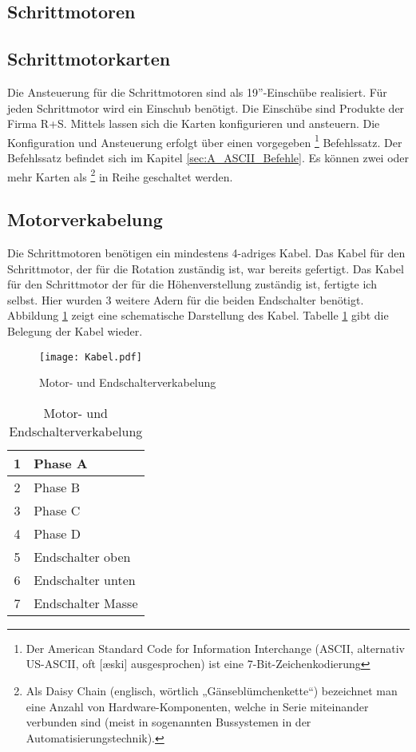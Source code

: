 \subsection{Schrittmotoren}

\subsection{Schrittmotorkarten}
Die Ansteuerung für die Schrittmotoren sind als 19''-Einschübe realisiert. Für jeden Schrittmotor wird ein Einschub benötigt.
Die Einschübe sind Produkte der Firma R+S. Mittels  lassen sich die Karten konfigurieren und ansteuern. Die Konfiguration und Ansteuerung erfolgt über einen vorgegeben 
\footnote{Der American Standard Code for Information Interchange (ASCII, alternativ US-ASCII, oft [æski] ausgesprochen) ist eine 7-Bit-Zeichenkodierung\cite{wiki:ASCII}}
 Befehlssatz. Der Befehlssatz befindet sich im Kapitel \ref{sec:A_ASCII_Befehle}. Es können zwei oder mehr Karten als 
\footnote{Als Daisy Chain (englisch, wörtlich „Gänseblümchenkette“) bezeichnet man eine Anzahl von Hardware-Komponenten, welche in Serie miteinander verbunden sind (meist in sogenannten Bussystemen in der Automatisierungstechnik).\cite{wiki:Daisy} } 
in Reihe geschaltet werden.
\subsection{Motorverkabelung}
Die Schrittmotoren benötigen ein mindestens 4-adriges Kabel. Das Kabel für den Schrittmotor, der für die Rotation zuständig ist, war bereits gefertigt. Das Kabel für den Schrittmotor der für die Höhenverstellung zuständig ist, fertigte ich selbst. Hier wurden 3 weitere Adern für die beiden Endschalter benötigt.\\ Abbildung \ref{fig:Motorverkabelung} zeigt eine schematische Darstellung des Kabel. Tabelle \ref{tab:Motorverkabelung} gibt die Belegung der Kabel wieder.

\begin{figure}[htb]
\centering
\texttt{[image: Kabel.pdf]}
\caption{Motor- und Endschalterverkabelung}
\label{fig:Motorverkabelung}
\end{figure}


\begin{longtable}{|c|l|} 
\caption{Motor- und Endschalterverkabelung} \\
\hline
\label{tab:Motorverkabelung}
1 & Phase A \\ 
\hline 
2 & Phase B \\ 
\hline 
3 & Phase C \\ 
\hline 
4 & Phase D \\ 
\hline 
5 & Endschalter oben \\ 
\hline 
6 & Endschalter unten \\ 
\hline 
7 & Endschalter Masse \\ 
\hline 
\end{longtable} 
